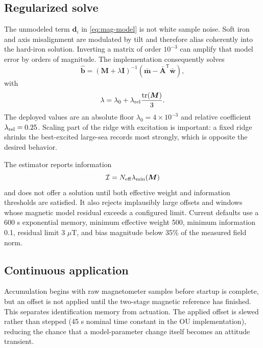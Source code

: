 \documentclass[conference]{IEEEtran}
\DeclareRobustCommand{\vct}[1]{\bm{#1}}
\DeclareRobustCommand{\mat}[1]{\bm{#1}}
\newcommand{\T}{^{\mathsf T}}
\begin{document}
\subsection{Regularized solve}

The unmodeled term $\vct d_i$ in \cref{eq:mag-model} is not white sample noise.  Soft
iron and axis misalignment are modulated by tilt and therefore alias coherently into
the hard-iron solution.  Inverting a matrix of order $10^{-3}$ can amplify that model
error by orders of magnitude.  The implementation consequently solves
\begin{equation}
\hat{\vct b}
 = \left(\mat M+\lambda\mat I\right)^{-1}
   \left(\bar{\vct m}-\bar{\mat A}\T\bar{\vct w}\right),
\label{eq:ridge-solve}
\end{equation}
with
\begin{equation}
\lambda
 = \lambda_0
 + \lambda_{\rm rel}\frac{\operatorname{tr}(\mat M)}{3}.
\label{eq:ridge}
\end{equation}
The deployed values are an absolute floor $\lambda_0=4\times10^{-3}$ and relative
coefficient $\lambda_{\rm rel}=0.25$.  Scaling part of the ridge with excitation is
important: a fixed ridge shrinks the best-excited large-sea records most strongly,
which is opposite the desired behavior.

The estimator reports information
\begin{equation}
\mathcal I = N_{\rm eff}\lambda_{\min}(\mat M)
\label{eq:information}
\end{equation}
and does not offer a solution until both effective weight and information thresholds
are satisfied.  It also rejects implausibly large offsets and windows whose magnetic
model residual exceeds a configured limit.  Current defaults use a 600 s exponential
memory, minimum effective weight 500, minimum information 0.1, residual limit
3 $\mu$T, and bias magnitude below 35\% of the measured field norm.

\subsection{Continuous application}

Accumulation begins with raw magnetometer samples before startup is complete, but an
offset is not applied until the two-stage magnetic reference has finished.  This
separates identification memory from actuation.  The applied offset is slewed rather
than stepped (45 s nominal time constant in the OU implementation), reducing the
chance that a model-parameter change itself becomes an attitude transient.
\end{document}

